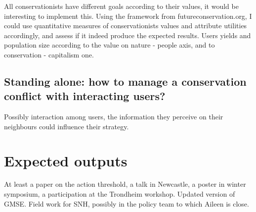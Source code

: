 \documentclass[12pt,a4paper]{article}
\begin{document}
All conservationists have different goals according to their values, it would be interesting to implement this. Using the framework from futureconservation.org, I could use quantitative measures of conservationists values and attribute utilities accordingly, and assess if it indeed produce the expected results. Users yields and population size according to the value on nature - people axis, and to conservation - capitalism one. 

\subsection{Standing alone: how to manage a conservation conflict with interacting users?}

Possibly interaction among users, the information they perceive on their neighbours could influence their strategy.

\section{Expected outputs}

At least a paper on the action threshold, a talk in Newcastle, a poster in winter symposium, a participation at the Trondheim workshop. Updated version of GMSE. Field work for SNH, possibly in the policy team to which Aileen is close.

\newpage

\nocite{*}
\end{document}
